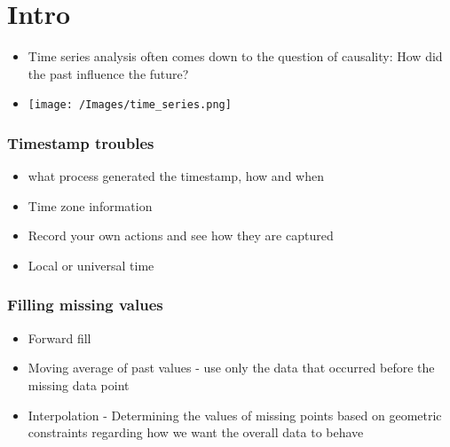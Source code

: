 \documentclass[
  letterpaper,
  DIV=11,
  numbers=noendperiod]{scrartcl}
\author{}
\date{}
\providecommand{\tightlist}{%
  \setlength{\itemsep}{0pt}\setlength{\parskip}{0pt}}\usepackage{longtable,booktabs,array}
\begin{document}
\ifdefined\Shaded\renewenvironment{Shaded}{\begin{tcolorbox}[interior hidden, borderline west={3pt}{0pt}{shadecolor}, frame hidden, sharp corners, enhanced, breakable, boxrule=0pt]}{\end{tcolorbox}}\fi

\hypertarget{intro}{%
\section{Intro}\label{intro}}

\begin{itemize}
\tightlist
\item
  Time series analysis often comes down to the question of causality:
  How did the past influence the future?
\item
  \texttt{[image: /Images/time\_series.png]}
\end{itemize}

\hypertarget{timestamp-troubles}{%
\subsubsection{Timestamp troubles}\label{timestamp-troubles}}

\begin{itemize}
\tightlist
\item
  what process generated the timestamp, how and when
\item
  Time zone information
\item
  Record your own actions and see how they are captured
\item
  Local or universal time
\end{itemize}

\hypertarget{filling-missing-values}{%
\subsubsection{Filling missing values}\label{filling-missing-values}}

\begin{itemize}
\tightlist
\item
  Forward fill
\item
  Moving average of past values - use only the data that occurred before
  the missing data point
\item
  Interpolation - Determining the values of missing points based on
  geometric constraints regarding how we want the overall data to behave
\end{itemize}
\end{document}

